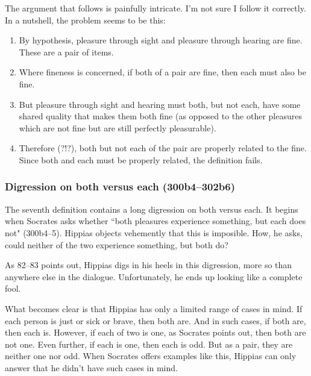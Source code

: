 \documentclass[12pt]{article}
\begin{document}
The argument that follows is painfully intricate.  I'm not sure I follow it correctly.  In a nutshell, the problem seems to be this:

\begin{enumerate}
    \item By hypothesis, pleasure through sight and pleasure through hearing are fine.  These are a pair of items.
    \item Where fineness is concerned, if both of a pair are fine, then each must also be fine.
    \item But pleasure through sight and hearing must both, but not each, have some shared quality that makes them both fine (as opposed to the other pleasures which are not fine but are still perfectly pleasurable).
    \item Therefore (?!?), both but not each of the pair are properly related to the fine.  Since both and each must be properly related, the definition fails.
\end{enumerate}


\subsubsection{Digression on both versus each (300b4--302b6)}

The seventh definition contains a long digression on both versus each.  It begins when Socrates asks whether ``both pleasures experience something, but each does not" (300b4--5).  Hippias objects vehemently that this is imposible.  How, he asks, could neither of the two experience something, but both do?

As \citet{woodruff1982} 82--83 points out, Hippias digs in his heels in this digression, more so than anywhere else in the dialogue.  Unfortunately, he ends up looking like a complete fool.

What becomes clear is that Hippias has only a limited range of cases in mind.  If each person is just or sick or brave, then both are.  And in such cases, if both are, then each is.  However, if each of two is one, as Socrates points out, then both are not one.  Even further, if each is one, then each is odd.  But as a pair, they are neither one nor odd.  When Socrates offers examples like this, Hippias can only answer that he didn't have such cases in mind.

\end{document}
